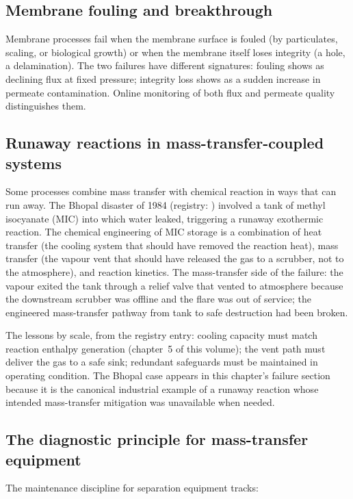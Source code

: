 \subsection{Membrane fouling and breakthrough}

Membrane processes fail when the membrane surface is fouled (by
particulates, scaling, or biological growth) or when the membrane
itself loses integrity (a hole, a delamination). The two failures
have different signatures: fouling shows as declining flux at fixed
pressure; integrity loss shows as a sudden increase in permeate
contamination. Online monitoring of both flux and permeate quality
distinguishes them.

\subsection{Runaway reactions in mass-transfer-coupled systems}

Some processes combine mass transfer with chemical reaction in ways
that can run away. The Bhopal disaster of 1984 (registry:
\cite{acc:icmr-bhopal-2004}) involved a tank of methyl isocyanate
(MIC) into which water leaked, triggering a runaway exothermic
reaction. The chemical engineering of MIC storage is a combination
of heat transfer (the cooling system that should have removed the
reaction heat), mass transfer (the vapour vent that should have
released the gas to a scrubber, not to the atmosphere), and reaction
kinetics. The mass-transfer side of the failure: the vapour exited
the tank through a relief valve that vented to atmosphere because
the downstream scrubber was offline and the flare was out of
service; the engineered mass-transfer pathway from tank to safe
destruction had been broken.

The lessons by scale, from the registry entry: cooling capacity
must match reaction enthalpy generation (chapter~5 of this volume);
the vent path must deliver the gas to a safe sink; redundant
safeguards must be maintained in operating condition. The Bhopal
case appears in this chapter's failure section because it is the
canonical industrial example of a runaway reaction whose intended
mass-transfer mitigation was unavailable when needed.

\subsection{The diagnostic principle for mass-transfer equipment}

The maintenance discipline for separation equipment tracks:

